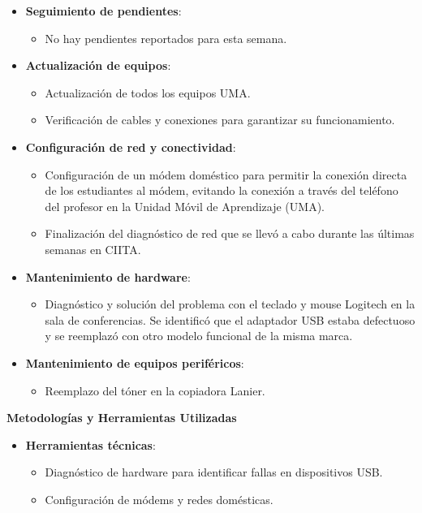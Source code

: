 \begin{itemize}
	\item \textbf{Seguimiento de pendientes}:
	\begin{itemize}
		\item No hay pendientes reportados para esta semana.
	\end{itemize}
	
	\item \textbf{Actualización de equipos}:
	\begin{itemize}
		\item Actualización de todos los equipos UMA.
		\item Verificación de cables y conexiones para garantizar su funcionamiento.
	\end{itemize}
	
	\item \textbf{Configuración de red y conectividad}:
	\begin{itemize}
		\item Configuración de un módem doméstico para permitir la conexión directa de los estudiantes al módem, evitando la conexión a través del teléfono del profesor en la Unidad Móvil de Aprendizaje (UMA).
		\item Finalización del diagnóstico de red que se llevó a cabo durante las últimas semanas en CIITA.
	\end{itemize}
	
	\item \textbf{Mantenimiento de hardware}:
	\begin{itemize}
		\item Diagnóstico y solución del problema con el teclado y mouse Logitech en la sala de conferencias. Se identificó que el adaptador USB estaba defectuoso y se reemplazó con otro modelo funcional de la misma marca.
	\end{itemize}
	
	\item \textbf{Mantenimiento de equipos periféricos}:
	\begin{itemize}
		\item Reemplazo del tóner en la copiadora Lanier.
	\end{itemize}
\end{itemize}

\textbf{Metodologías y Herramientas Utilizadas}
\begin{itemize}
	\item \textbf{Herramientas técnicas}:
	\begin{itemize}
		\item Diagnóstico de hardware para identificar fallas en dispositivos USB.
		\item Configuración de módems y redes domésticas.
	\end{itemize}
\end{itemize}

